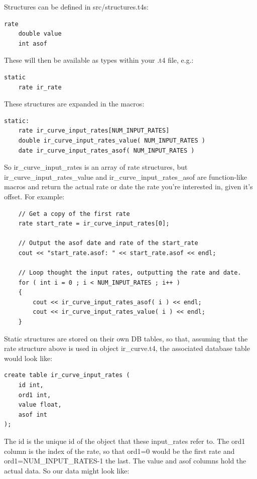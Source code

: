 \documentclass{report}
\begin{document}
Structures can be defined in src/structures.t4s:

\begin{verbatim}
rate
    double value
    int asof
\end{verbatim}

These will then be available as types within your .t4 file, e.g.:

\begin{verbatim}
static
    rate ir_rate
\end{verbatim}

These structures are expanded in the macros:

\begin{verbatim}
static:
    rate ir_curve_input_rates[NUM_INPUT_RATES]
    double ir_curve_input_rates_value( NUM_INPUT_RATES )
    date ir_curve_input_rates_asof( NUM_INPUT_RATES )
\end{verbatim}

So ir_curve_input_rates is an array of rate structures, but ir_curve_input_rates_value and ir_curve_input_rates_asof are function-like macros and return the actual rate or date the rate you're interested in, given it's offset. For example:

\begin{verbatim}
    // Get a copy of the first rate
    rate start_rate = ir_curve_input_rates[0];

    // Output the asof date and rate of the start_rate
    cout << "start_rate.asof: " << start_rate.asof << endl;

    // Loop thought the input rates, outputting the rate and date.
    for ( int i = 0 ; i < NUM_INPUT_RATES ; i++ )
    {
        cout << ir_curve_input_rates_asof( i ) << endl;
        cout << ir_curve_input_rates_value( i ) << endl;
    }
\end{verbatim}


Static structures are stored on their own DB tables, so that, assuming that the rate structure above is used in object ir_curve.t4, the associated database table would look like:

\begin{verbatim}
create table ir_curve_input_rates (
    id int,
    ord1 int,
    value float,
    asof int
);
\end{verbatim}

The id is the unique id of the object that these input_rates refer to. The ord1 column is the index of the rate, so that ord1=0 would be the first rate and ord1=NUM_INPUT_RATES-1 the last. The value and asof columns hold the actual data. So our data might look like:
\end{document}
